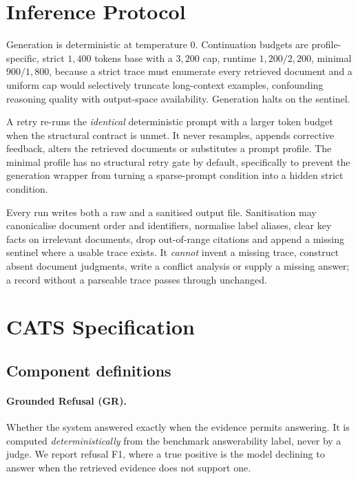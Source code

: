 \section{Inference Protocol}
\label{app:inference}

Generation is deterministic at temperature $0$. Continuation budgets are
profile-specific, strict $1{,}400$ tokens base with a $3{,}200$ cap, runtime
$1{,}200/2{,}200$, minimal $900/1{,}800$, because a strict trace must enumerate
every retrieved document and a uniform cap would selectively truncate
long-context examples, confounding reasoning quality with output-space
availability. Generation halts on the sentinel.

A retry re-runs the \emph{identical} deterministic prompt with a larger token
budget when the structural contract is unmet. It never resamples, appends
corrective feedback, alters the retrieved documents or substitutes a prompt
profile. The minimal profile has no structural retry gate by default,
specifically to prevent the generation wrapper from turning a sparse-prompt
condition into a hidden strict condition.

Every run writes both a raw and a sanitised output file. Sanitisation may
canonicalise document order and identifiers, normalise label aliases, clear key
facts on irrelevant documents, drop out-of-range citations and append a missing
sentinel where a usable trace exists. It \emph{cannot} invent a missing trace,
construct absent document judgments, write a conflict analysis or supply a
missing answer; a record without a parseable trace passes through unchanged.

\section{CATS Specification}
\label{app:cats}

\subsection{Component definitions}

\paragraph{Grounded Refusal (GR).} Whether the system answered exactly when the
evidence permits answering. It is computed \emph{deterministically} from the
benchmark answerability label, never by a judge. We report refusal F1, where a
true positive is the model declining to answer when the retrieved evidence does
not support one.

